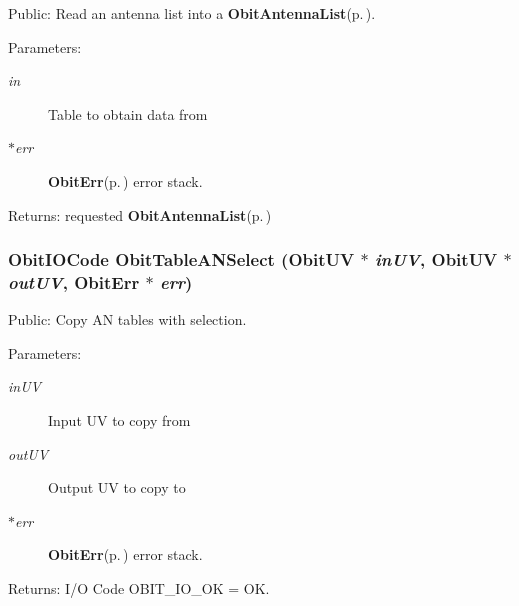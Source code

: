 Public: Read an antenna list into a {\bf Obit\-Antenna\-List}{\rm (p.\,\pageref{structObitAntennaList})}. 

\begin{Desc}
\item[Parameters:]
\begin{description}
\item[{\em in}]Table to obtain data from \item[{\em $\ast$err}]{\bf Obit\-Err}{\rm (p.\,\pageref{structObitErr})} error stack. \end{description}
\end{Desc}
\begin{Desc}
\item[Returns:]requested {\bf Obit\-Antenna\-List}{\rm (p.\,\pageref{structObitAntennaList})} \end{Desc}
\subsubsection{\setlength{\rightskip}{0pt plus 5cm}Obit\-IOCode Obit\-Table\-ANSelect ({\bf Obit\-UV} $\ast$ {\em in\-UV}, {\bf Obit\-UV} $\ast$ {\em out\-UV}, {\bf Obit\-Err} $\ast$ {\em err})}\label{ObitTableANUtil_8h_a2}


Public: Copy AN tables with selection. 

\begin{Desc}
\item[Parameters:]
\begin{description}
\item[{\em in\-UV}]Input UV to copy from \item[{\em out\-UV}]Output UV to copy to \item[{\em $\ast$err}]{\bf Obit\-Err}{\rm (p.\,\pageref{structObitErr})} error stack. \end{description}
\end{Desc}
\begin{Desc}
\item[Returns:]I/O Code OBIT\_\-IO\_\-OK = OK. \end{Desc}
